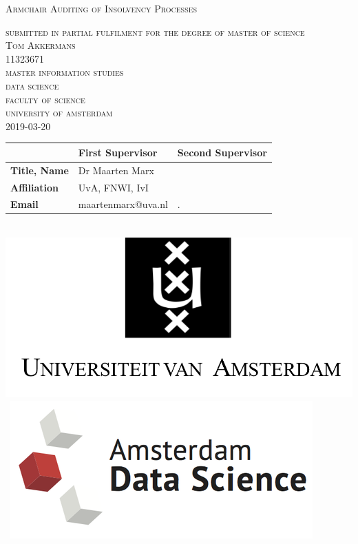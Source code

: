 \begin{titlepage}
\begin{center}

\textsc{\Large Armchair Auditing of Insolvency Processes }


\textsc{\large
	submitted in partial fulfilment for the degree of master of science\\
	Tom Akkermans\\
	11323671\\
	master information studies\\
	data science \\
	faculty of science\\
	university of amsterdam\\
	2019-03-20
}

\end{center}
 
\vfill

\begin{center}
\begin{tabular}{|l||ll|}
\hline
 & \textbf{First Supervisor} & \textbf{Second Supervisor}  \\   
 \hline
\textbf{Title, Name} & Dr Maarten Marx&  \\
\textbf{Affiliation} &UvA, FNWI, IvI & \\ 
\textbf{Email} & maartenmarx@uva.nl& . \\
\hline
\end{tabular}
\end{center}


\begin{center}
	\mbox{
		\includegraphics[width=.2\paperwidth]{images/logo-uva.png} 
		\includegraphics[width=.2\paperwidth]{images/ads.png}
	}
\end{center}

\end{titlepage}

